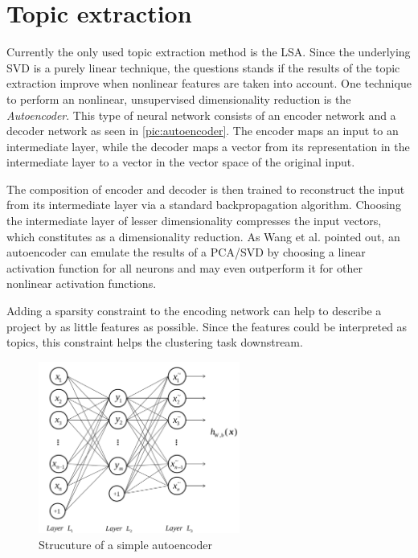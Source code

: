 \section{Topic extraction}

Currently the only used topic extraction method is the LSA. Since the underlying SVD is a purely linear technique, the questions stands if the results of the topic extraction improve when nonlinear features are taken into account. One technique to perform an nonlinear, unsupervised dimensionality reduction is the \textit{Autoencoder}. This type of neural network consists of an encoder network and a decoder network as seen in \autoref{pic:autoencoder}. The encoder maps an input to an intermediate layer, while the decoder maps a vector from its representation in the intermediate layer to a vector in the vector space of the original input.

The composition of encoder and decoder is then trained to reconstruct the input from its intermediate layer via a standard backpropagation algorithm. Choosing the intermediate layer of lesser dimensionality compresses the input vectors, which constitutes as a dimensionality reduction. As Wang et al. \cite{wangAutoencoderBasedDimensionality2016} pointed out, an autoencoder can emulate the results of a PCA/SVD by choosing a linear activation function for all neurons and may even outperform it for other nonlinear activation functions.

Adding a sparsity constraint to the encoding network can help to describe a project by as little features as possible. Since the features could be interpreted as topics, this constraint helps the clustering task downstream.

\begin{figure}[t]
	\centering
	\includegraphics[width=250px]{../chapters/implementation/pics/autoencoder}
	\caption{\label{pic:autoencoder} Strucuture of a simple autoencoder {\cite{wangAutoencoderBasedDimensionality2016}}}
\end{figure} 

